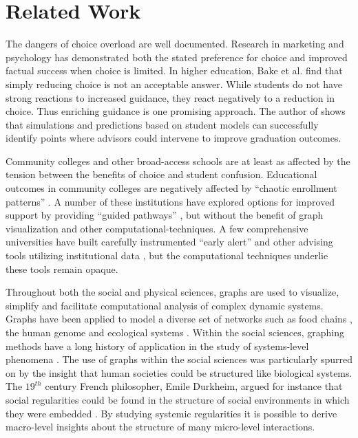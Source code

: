 \documentclass{sigchi}
\begin{document}



\section{Related Work}


The dangers of choice overload are well documented. Research in marketing \cite{botti2006} and psychology \cite{schwartz2004paradox,iyengar2000} has demonstrated both the stated preference for
choice and improved factual success when choice is limited. In higher education, Bake et al. \cite{bake2018} find that simply reducing choice is not an acceptable answer. While students do not have strong reactions to increased guidance, they react negatively to a reduction in choice. Thus enriching guidance is one promising
approach. The author of \cite{slim2016} shows that simulations and
predictions based on student models can successfully identify points
where advisors could intervene to improve graduation outcomes.

Community colleges and other broad-access schools are at least as affected by the tension between the benefits of choice and student confusion. Educational
outcomes in community colleges are negatively affected by ``chaotic
enrollment patterns'' \cite{crosta2014, bail2015, scot2015}. A number of these institutions have explored options for improved support by providing ``guided pathways'' \cite{jenkins2013}, but without the benefit of graph visualization and other computational-techniques. A few comprehensive universities have built carefully instrumented ``early alert'' and other advising tools utilizing institutional data \cite{fletcher2016integrated}, but the computational techniques underlie these tools remain opaque. 

Throughout both the social and physical sciences, graphs are used to visualize, simplify and facilitate computational analysis of complex dynamic systems. Graphs have been applied to model a diverse set of networks such as food chains \cite{Hall1993}, the human genome \cite{Pevzner1989} and ecological systems \cite{Fortin2012}. Within the social sciences, graphing methods have a long history of application in the study of systems-level phenomena \cite{Borgatti2009}. The use of graphs within the social sciences was particularly spurred on by the insight that human societies could be structured like biological systems. The $19^{th}$ century French philosopher, Emile Durkheim, argued for instance that social regularities could be found in the structure of social environments in which they were embedded \cite{Durkheim1951}. By studying systemic regularities it is possible to derive macro-level insights about the structure of many micro-level interactions. 
\end{document}

